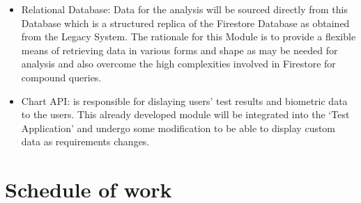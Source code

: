 \documentclass{report}
\begin{document}
\begin{itemize}
    \item{Relational Database}: Data for the analysis will be sourced directly from this Database which is a structured replica of
    the Firestore Database as obtained from the Legacy System. The rationale for this Module is to provide a flexible means of
    retrieving data in various forms and shape as may be needed for analysis and also overcome the high complexities involved
    in Firestore for compound queries.
    \item{Chart API}:  is responsible for dislaying users' test results and biometric data to the users. This already developed 
    module will be integrated into the `Test Application' and undergo some modification to be able to display custom data as 
    requirements changes.
    \end{itemize}
    
    \section*{Schedule of work}
    \printbibliography
\end{document}
